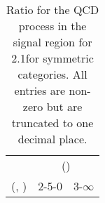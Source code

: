 \begin{table}[h!]
\tiny
\centering
\caption{Ratio for the QCD process in the signal region for 2.1\ifb for symmetric categories. All entries are non-zero but are truncated to one decimal place.\label{tab:ratiosepnaive_sig_qcd_sym}}
\begin{tabular}
{ccc}
	\hline\hline
	& \multicolumn{2}{c}{\scalht (\gev)} \\ 
	 (\njet,  \nb) & 2-5-0 & 3-$\infty$ \\ [0.8ex] 
\hline
	\hline
	\hline
\end{tabular}
\end{table}
